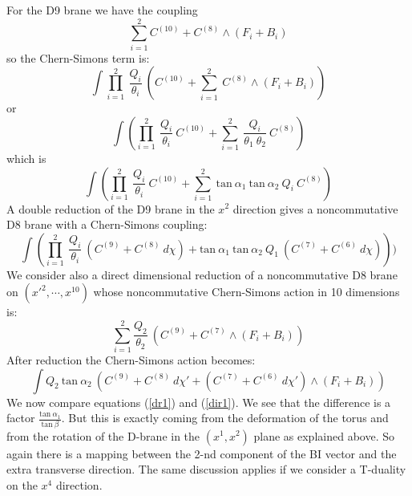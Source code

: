 \documentclass[a4paper,12pt]{article}
\begin{document}
For the D9 brane we have the coupling 
\begin{equation}
\sum_{i=1}^{2}  C^{(10)} + C^{(8)} \wedge (F_i + B_i)
\end{equation}  
so the Chern-Simons term is:
\begin{equation}
\int \prod_{i=1}^{2}~\frac{Q_i}{\theta_i}
~(C^{(10)} + \sum_{i=1}^{2}~C^{(8)} \wedge (F_i + B_i))
\end{equation}
or
\begin{equation} 
\int (\prod_{i=1}^{2}~\frac{Q_i}{\theta_i}~C^{(10)}
+ \sum_{i=1}^{2}~\frac{Q_i}{\theta_1~\theta_2}~C^{(8)}) 
\end{equation}
which is
\begin{equation} 
\int (\prod_{i=1}^{2}~\frac{Q_i}{\theta_i}~C^{(10)}
+ \sum_{i=1}^{2}~\mbox{tan}~\alpha_1~\mbox{tan}~\alpha_2
~Q_i~C^{(8)})
\end{equation}
A double reduction of the D9 brane in the $x^2$ direction gives a 
noncommutative D8 brane with a Chern-Simons coupling:
\begin{equation}
\label{dr1}
\int (\prod_{i=1}^{2}~\frac{Q_i}{\theta_i}~(C^{(9)} +
C^{(8)}~d \chi)
+ \mbox{tan}~\alpha_1~\mbox{tan}~\alpha_2
~Q_1~(C^{(7)} + C^{(6)}~d \chi)))
\end{equation}
We consider also a direct dimensional reduction of a noncommutative D8 
brane on $(x'^2,\cdots,x^{10})$ whose noncommutative 
Chern-Simons action in 10 dimensions is:
\begin{equation}
\sum_{i=1}^{2} \frac{Q_2}{\theta_2}~(C^{(9)} + C^{(7)} \wedge (F_i + B_i))
\end{equation}  
After reduction the Chern-Simons action becomes:
\begin{equation}
\label{dir1}
\int Q_2~\mbox{tan}~\alpha_2~(C^{(9)} + C^{(8)}~d \chi' + (C^{(7)} 
+ C^{(6)}~d \chi') \wedge (F_i + B_i))
\end{equation}
We now compare equations (\ref{dr1}) and (\ref{dir1}). We see that the 
difference is a factor $\frac{\mbox{tan}~\alpha_1}{\mbox{tan}~\beta}$.
But this is exactly coming from the deformation of the torus and from the
rotation of the D-brane in the $(x^1, x^2)$ plane as explained above. 
So again there is a mapping between the 2-nd component of the BI vector and
the extra transverse direction.
The same discussion applies if we consider a T-duality on the $x^4$ direction.
\end{document}
